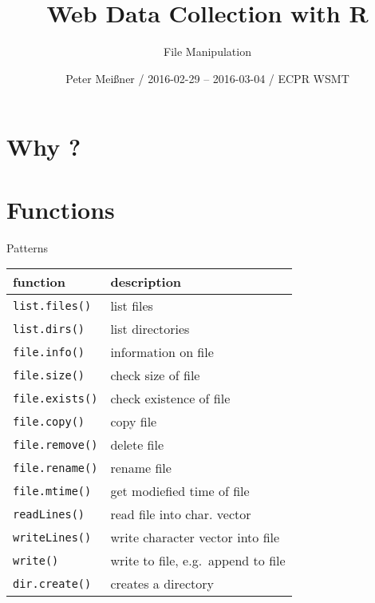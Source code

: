 \documentclass[ignorenonframetext,]{beamer}
\title{Web Data Collection with R}
\subtitle{File Manipulation}
\author{Peter Meißner / 2016-02-29 -- 2016-03-04 / ECPR WSMT}
\date{}
\begin{document}
\frame{\titlepage}

\begin{frame}
\tableofcontents[hideallsubsections]
\end{frame}

\section{Why ?}\label{why}

\section{Functions}\label{functions}

\begin{frame}[fragile]{Patterns}

\begin{longtable}[c]{@{}ll@{}}
\toprule
function & description\tabularnewline
\midrule
\endhead
\texttt{list.files()} & list files\tabularnewline
\texttt{list.dirs()} & list directories\tabularnewline
\texttt{file.info()} & information on file\tabularnewline
\texttt{file.size()} & check size of file\tabularnewline
\texttt{file.exists()} & check existence of file\tabularnewline
\texttt{file.copy()} & copy file\tabularnewline
\texttt{file.remove()} & delete file\tabularnewline
\texttt{file.rename()} & rename file\tabularnewline
\texttt{file.mtime()} & get modiefied time of file\tabularnewline
\texttt{readLines()} & read file into char. vector\tabularnewline
\texttt{writeLines()} & write character vector into file\tabularnewline
\texttt{write()} & write to file, e.g.~append to file\tabularnewline
\texttt{dir.create()} & creates a directory\tabularnewline
\bottomrule
\end{longtable}

~

\end{frame}
\end{document}
